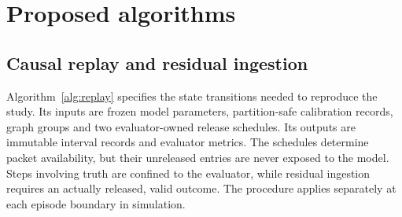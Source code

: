 \section{Proposed algorithms}\label{sec:algorithm}
\subsection{Causal replay and residual ingestion}
Algorithm~\ref{alg:replay} specifies the state transitions needed to reproduce the study. Its inputs are frozen model parameters, partition-safe calibration records, graph groups and two evaluator-owned release schedules. Its outputs are immutable interval records and evaluator metrics. The schedules determine packet availability, but their unreleased entries are never exposed to the model. Steps involving truth are confined to the evaluator, while residual ingestion requires an actually released, valid outcome. The procedure applies separately at each episode boundary in simulation.

